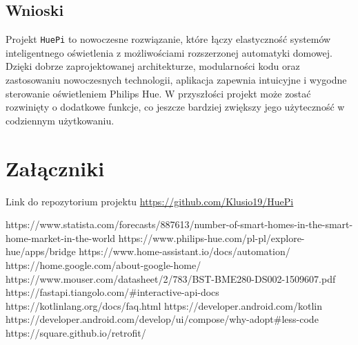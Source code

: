 \documentclass[12pt]{article}
\begin{document}
\subsection{Wnioski}
Projekt \texttt{HuePi} to nowoczesne rozwiązanie, które łączy elastyczność systemów inteligentnego oświetlenia z możliwościami rozszerzonej automatyki domowej. Dzięki dobrze zaprojektowanej
architekturze, modularności kodu oraz zastosowaniu nowoczesnych technologii, aplikacja zapewnia intuicyjne i wygodne sterowanie oświetleniem Philips Hue. W przyszłości projekt może zostać rozwinięty
o dodatkowe funkcje, co jeszcze bardziej zwiększy jego użyteczność w codziennym użytkowaniu.


\clearpage

\section*{Załączniki}

Link do repozytorium projektu \url{https://github.com/Klusio19/HuePi}

\clearpage


\begin{thebibliography}{4}
     https://www.statista.com/forecasts/887613/number-of-smart-homes-in-the-smart-home-market-in-the-world
     https://www.philips-hue.com/pl-pl/explore-hue/apps/bridge
     https://www.home-assistant.io/docs/automation/
     https://home.google.com/about-google-home/
     https://www.mouser.com/datasheet/2/783/BST-BME280-DS002-1509607.pdf
     https://fastapi.tiangolo.com/\#interactive-api-docs
     https://kotlinlang.org/docs/faq.html
     https://developer.android.com/kotlin
     https://developer.android.com/develop/ui/compose/why-adopt\#less-code
     https://square.github.io/retrofit/

\end{thebibliography}

\clearpage

\makesummary
\end{document}
